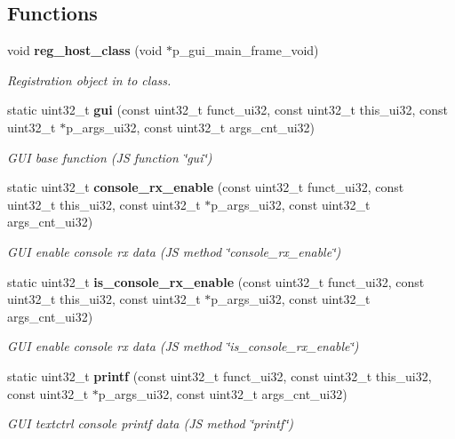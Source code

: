 \subsection*{Functions}
\begin{DoxyCompactItemize}
\item 
void \textbf{ reg\+\_\+host\+\_\+class} (void $\ast$p\+\_\+gui\+\_\+main\+\_\+frame\+\_\+void)
\begin{DoxyCompactList}\small\item\em Registration object in to class. \end{DoxyCompactList}\item 
static uint32\+\_\+t \textbf{ gui} (const uint32\+\_\+t funct\+\_\+ui32, const uint32\+\_\+t this\+\_\+ui32, const uint32\+\_\+t $\ast$p\+\_\+args\+\_\+ui32, const uint32\+\_\+t args\+\_\+cnt\+\_\+ui32)
\begin{DoxyCompactList}\small\item\em G\+UI base function (JS function \char`\"{}gui\char`\"{}) \end{DoxyCompactList}\item 
static uint32\+\_\+t \textbf{ console\+\_\+rx\+\_\+enable} (const uint32\+\_\+t funct\+\_\+ui32, const uint32\+\_\+t this\+\_\+ui32, const uint32\+\_\+t $\ast$p\+\_\+args\+\_\+ui32, const uint32\+\_\+t args\+\_\+cnt\+\_\+ui32)
\begin{DoxyCompactList}\small\item\em G\+UI enable console rx data (JS method \char`\"{}console\+\_\+rx\+\_\+enable\char`\"{}) \end{DoxyCompactList}\item 
static uint32\+\_\+t \textbf{ is\+\_\+console\+\_\+rx\+\_\+enable} (const uint32\+\_\+t funct\+\_\+ui32, const uint32\+\_\+t this\+\_\+ui32, const uint32\+\_\+t $\ast$p\+\_\+args\+\_\+ui32, const uint32\+\_\+t args\+\_\+cnt\+\_\+ui32)
\begin{DoxyCompactList}\small\item\em G\+UI enable console rx data (JS method \char`\"{}is\+\_\+console\+\_\+rx\+\_\+enable\char`\"{}) \end{DoxyCompactList}\item 
static uint32\+\_\+t \textbf{ printf} (const uint32\+\_\+t funct\+\_\+ui32, const uint32\+\_\+t this\+\_\+ui32, const uint32\+\_\+t $\ast$p\+\_\+args\+\_\+ui32, const uint32\+\_\+t args\+\_\+cnt\+\_\+ui32)
\begin{DoxyCompactList}\small\item\em G\+UI textctrl console printf data (JS method \char`\"{}printf\char`\"{}) \end{DoxyCompactList}\item 

\end{DoxyCompactItemize}

